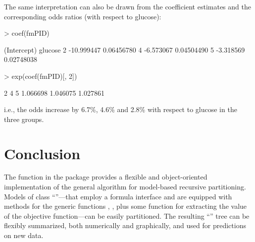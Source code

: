 \documentclass{Z}
\begin{document}
The same interpretation can also be drawn from the coefficient estimates
and the corresponding odds ratios (with respect to glucose):

\begin{Schunk}
\begin{Sinput}
> coef(fmPID)
\end{Sinput}
\begin{Soutput}
  (Intercept)    glucose
2  -10.999447 0.06456780
4   -6.573067 0.04504490
5   -3.318569 0.02748038
\end{Soutput}
\begin{Sinput}
> exp(coef(fmPID)[, 2])
\end{Sinput}
\begin{Soutput}
       2        4        5 
1.066698 1.046075 1.027861 
\end{Soutput}
\end{Schunk}


i.e., the odds increase by 6.7\%, 4.6\% and 2.8\%
with respect to glucose in the three groups.



\section{Conclusion}
\label{sec:conclusion}

The function  in the  package provides a flexible and object-oriented
implementation of the general algorithm for model-based recursive partitioning.
Models of class ``''---that employ a formula interface and are equipped with
methods for the generic functions , ,  plus
some function for extracting the value of the objective function---can be easily partitioned.
The resulting ``'' tree can be flexibly summarized, both numerically and graphically,
and used for predictions on new data.



\end{document}
